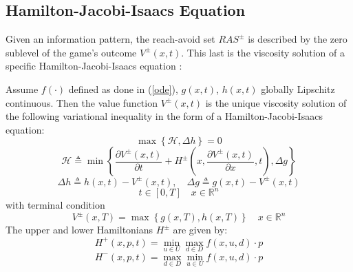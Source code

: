 \subsection{Hamilton-Jacobi-Isaacs Equation}
Given an information pattern, the reach-avoid set $RAS^\pm$ is described by the zero sublevel of the game's outcome $V^\pm(x,t)$. This last is the viscosity solution of a specific Hamilton-Jacobi-Isaacs equation \cite{new_paper}:
\begin{theorem}
    Assume $f(\cdot)$ defined as done in (\ref{ode}), $g(x,t)$, $h(x,t)$ globally Lipschitz continuous. Then the value function $V^\pm(x,t)$ is the unique viscosity solution of the following variational inequality in the form of a Hamilton-Jacobi-Isaacs equation:
    \[
        \max
        \left\{
            \mathcal{H}, \Delta h
        \right\} = 0
    \]
    \[
        \mathcal{H} \triangleq \min
        \left\{
            \frac{\partial V^\pm(x,t)}{\partial t} + 
            H^\pm\left(x, \frac{\partial V^\pm(x,t)}{\partial x}, t\right), \Delta g
        \right\} 
    \]
    \[
        \Delta h \triangleq h(x,t) - V^\pm(x,t), \quad \Delta g \triangleq g(x,t) - V^\pm(x,t)
    \]
    \[
        t \in [0, T] \quad x \in \mathbb{R}^n
    \]
    with terminal condition
    \[
        V^\pm(x,T) = \max \left\{ g(x,T), h(x,T) \right\} \quad x \in \mathbb{R}^n
    \]
    The upper and lower Hamiltonians $H^\pm$ are given by:
    \[
        H^+(x,p,t) = \min_{u \in U}\max_{d \in D} f(x, u, d)\cdot p
    \]    
    \[
        H^-(x,p,t) = \max_{d \in D}\min_{u \in U} f(x, u, d)\cdot p
    \]
\end{theorem}
